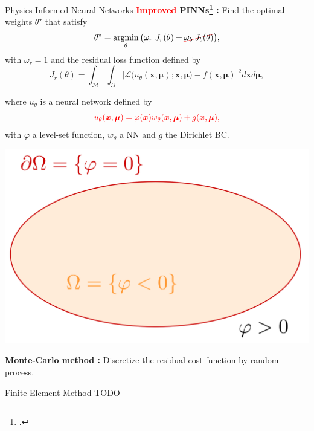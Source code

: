 \begin{frame}[noframenumbering]{Physics-Informed Neural Networks}
	\textbf{\textcolor{red}{Improved} PINNs\footcite{LagLikFot1998,FraMicNav2024} :} Find the optimal weights $\theta^\star$ that satisfy
	\begin{equation}
		\label{eq:opt_pb_nobc}
		\theta^\star = \argmin_{\theta}	\big( \omega_r \; J_r(\theta) + \Ccancel[red]{\omega_b \; J_b(\theta)} \big),
	\end{equation}
	with $\omega_r=1$ and the residual loss function defined by
	\begin{equation*}
		J_r(\theta) =
		\int_{\mathcal{M}}\int_{\Omega}
		\big| \mathcal{L}\big(u_\theta(\bm{x},\bm{\mu});\bm{x},\bm{\mu}\big)-f(\bm{x},\bm{\mu}) \big|^2 d\bm{x} d\bm{\mu},
	\end{equation*}
	\begin{minipage}{0.7\linewidth}
		where $u_\theta$ is a neural network defined by
		\begin{equation*}
			\textcolor{red}{u_{\theta}(\bm{x},\bm{\mu}) = \varphi(\bm{x}) w_{\theta}(\bm{x},\bm{\mu}) + g(\bm{x},\bm{\mu}),}
		\end{equation*}
		with $\varphi$ a level-set function, $w_\theta$ a NN and $g$ the Dirichlet BC. 
	\end{minipage}
	\begin{minipage}{0.28\linewidth}
		\vspace{-15pt}
		\includegraphics[width=0.95\linewidth]{images/intro/levelset.png}
	\end{minipage}

	\vspace{5pt}
	\textbf{Monte-Carlo method :} Discretize the residual cost function by random process.
	\vspace{15pt}
\end{frame}


\begin{frame}{Finite Element Method}
	TODO
\end{frame}